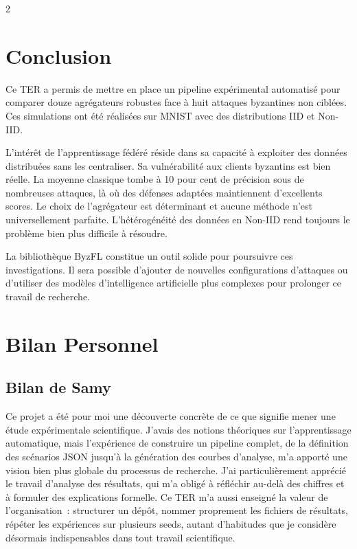 \documentclass{article}
\begin{document}
\begin{multicols}{2}
\section{Conclusion}

Ce TER a permis de mettre en place un pipeline exp\'erimental automatis\'e pour comparer douze agr\'egateurs robustes face \`a huit attaques byzantines non cibl\'ees. Ces simulations ont \'et\'e r\'ealis\'ees sur MNIST avec des distributions IID et Non-IID.

L'int\'er\^et de l'apprentissage f\'ed\'er\'e r\'eside dans sa capacit\'e \`a exploiter des donn\'ees distribu\'ees sans les centraliser. Sa vuln\'erabilit\'e aux clients byzantins est bien r\'eelle. La moyenne classique tombe \`a 10 pour cent de pr\'ecision sous de nombreuses attaques, l\`a o\`u des d\'efenses adapt\'ees maintiennent d'excellents scores. Le choix de l'agr\'egateur est d\'eterminant et aucune m\'ethode n'est universellement parfaite. L'h\'et\'erog\'en\'eit\'e des donn\'ees en Non-IID rend toujours le probl\`eme bien plus difficile \`a r\'esoudre.

La biblioth\`eque ByzFL constitue un outil solide pour poursuivre ces investigations. Il sera possible d'ajouter de nouvelles configurations d'attaques ou d'utiliser des mod\`eles d'intelligence artificielle plus complexes pour prolonger ce travail de recherche.
\section{Bilan Personnel}

\subsection*{Bilan de Samy}

Ce projet a \'et\'e pour moi une d\'ecouverte concr\`ete de ce que signifie mener
une \'etude exp\'erimentale scientifique. J'avais des notions th\'eoriques sur
l'apprentissage automatique, mais l'exp\'erience de construire un pipeline complet, de la d\'efinition des sc\'enarios JSON jusqu'\`a la g\'en\'eration des courbes
d'analyse, m'a apport\'e une vision bien plus globale du processus de recherche.
J'ai particuli\`erement appr\'eci\'e le travail d'analyse des r\'esultats, qui m'a oblig\'e \`a r\'efl\'echir au-del\`a des
chiffres et \`a formuler des explications formelle. Ce TER m'a aussi enseign\'e
la valeur de l'organisation~: structurer un d\'ep\^ot, nommer proprement les fichiers
de r\'esultats, r\'ep\'eter les exp\'eriences sur plusieurs seeds, autant d'habitudes
que je consid\`ere d\'esormais indispensables dans tout travail scientifique.


\end{multicols}
\end{document}
